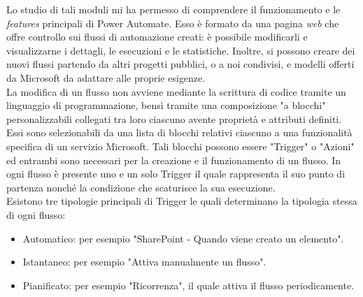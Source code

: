 \noindent Lo studio di tali moduli mi ha permesso di comprendere il funzionamento e le \emph{features} principali di Power Automate.
Esso è formato da una pagina \emph{web} che offre controllo sui flussi di automazione creati: è possibile modificarli e visualizzarne i dettagli, le esecuzioni e le statistiche. Inoltre, si possono creare dei nuovi flussi partendo da altri progetti pubblici, o a noi condivisi, e modelli offerti da Microsoft da adattare alle proprie esigenze.\\
La modifica di un flusso non avviene mediante la scrittura di codice tramite un linguaggio di programmazione, bensì tramite una composizione "a blocchi" personalizzabili collegati tra loro ciascuno avente proprietà e attributi definiti.\\
Essi sono selezionabili da una lista di blocchi relativi ciascuno a una funzionalità specifica di un servizio Microsoft.
Tali blocchi possono essere "Trigger" o "Azioni" ed entrambi sono necessari per la creazione e il funzionamento di un flusso.
In ogni flusso è presente uno e un solo Trigger il quale rappresenta il suo punto di partenza nonché la condizione che scaturisce la sua esecuzione.\\
Esistono tre tipologie principali di Trigger le quali determinano la tipologia stessa di ogni flusso:
\begin{itemize}
    \item Automatico: per esempio "SharePoint - Quando viene creato un elemento". 
    \item Istantaneo: per esempio "Attiva manualmente un flusso".
    \item Pianificato: per esempio "Ricorrenza", il quale attiva il flusso periodicamente.\\
\end{itemize}

